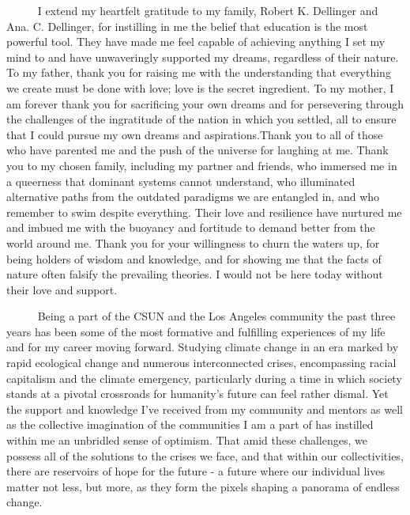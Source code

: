 \documentclass[
  12pt,
]{article}
\begin{document}
~~~~~ I extend my heartfelt gratitude to my family, Robert K. Dellinger
and Ana. C. Dellinger, for instilling in me the belief that education is
the most powerful tool. They have made me feel capable of achieving
anything I set my mind to and have unwaveringly supported my dreams,
regardless of their nature. To my father, thank you for raising me with
the understanding that everything we create must be done with love; love
is the secret ingredient. To my mother, I am forever thank you for
sacrificing your own dreams and for persevering through the challenges
of the ingratitude of the nation in which you settled, all to ensure
that I could pursue my own dreams and aspirations.Thank you to all of
those who have parented me and the push of the universe for laughing at
me. Thank you to my chosen family, including my partner and friends, who
immersed me in a queerness that dominant systems cannot understand, who
illuminated alternative paths from the outdated paradigms we are
entangled in, and who remember to swim despite everything. Their love
and resilience have nurtured me and imbued me with the buoyancy and
fortitude to demand better from the world around me. Thank you for your
willingness to churn the waters up, for being holders of wisdom and
knowledge, and for showing me that the facts of nature often falsify the
prevailing theories. I would not be here today without their love and
support.

~~~~~ Being a part of the CSUN and the Los Angeles community the past
three years has been some of the most formative and fulfilling
experiences of my life and for my career moving forward. Studying
climate change in an era marked by rapid ecological change and numerous
interconnected crises, encompassing racial capitalism and the climate
emergency, particularly during a time in which society stands at a
pivotal crossroads for humanity's future can feel rather dismal. Yet the
support and knowledge I've received from my community and mentors as
well as the collective imagination of the communities I am a part of has
instilled within me an unbridled sense of optimism. That amid these
challenges, we possess all of the solutions to the crises we face, and
that within our collectivities, there are reservoirs of hope for the
future - a future where our individual lives matter not less, but more,
as they form the pixels shaping a panorama of endless change.

\centering
\raggedright
\newpage
\tableofcontents

\newpage
\listoftables
\end{document}
